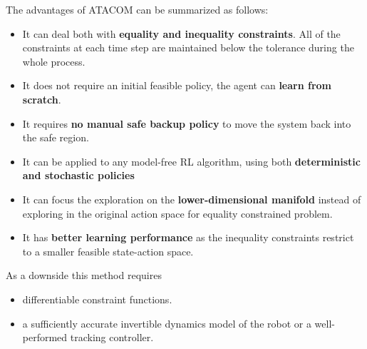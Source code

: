 The advantages of ATACOM can be summarized as follows:
\begin{itemize}
    \item It can deal both with \textbf{equality and inequality constraints}. All of the constraints at each time step are maintained
    below the tolerance during the whole process.
    \item It does not require an initial feasible policy, the agent can \textbf{learn from scratch}.
    \item It requires \textbf{no manual safe backup policy} to move the system back into the safe region.
    \item It can be applied to any model-free RL algorithm, using both \textbf{deterministic and stochastic policies}
    \item It can focus the exploration on the \textbf{lower-dimensional manifold} instead of exploring in the original action space
    for equality constrained problem.
    \item It has \textbf{better learning performance} as the inequality constraints restrict to a smaller feasible state-action space.
\end {itemize}

As a downside this method requires
\begin{itemize}
    \item differentiable constraint functions.
    \item a sufficiently accurate invertible dynamics model of the robot or a well-performed tracking controller.
\end{itemize}




